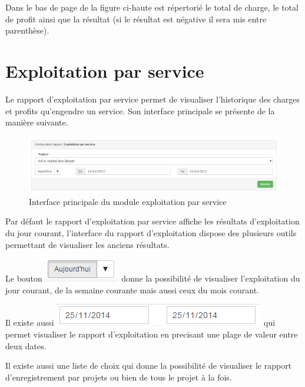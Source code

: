 \documentclass[12pt,a4paper]{report}
\begin{document}
Dans le bas de page de la figure ci-haute est répertorié le total de charge, le total de profit ainsi que la résultat (si le résultat est négative il sera mis entre parenthèse).

\newpage
\section{Exploitation par service}
Le rapport d'exploitation par service permet de visualiser l'historique des charges et profits qu'engendre un service. Son interface principale se présente de la manière suivante. 

\begin{figure}[h]
\begin{center}
\includegraphics[width=14cm]{pic/ExploService.png}
\end{center}
\caption{Interface principale du module exploitation par service}
\label{Interface principale du module exploitation par service}
\end{figure}

Par défaut le rapport d'exploitation par service affiche les résultats d'exploitation du jour courant, l'interface du rapport d'exploitation dispose des plusieurs outils permettant de visualiser les anciens résultats.

Le bouton \includegraphics[scale=0.7]{pic/Todays.png} donne la possibilité de visualiser l'exploitation du jour courant, de la semaine courante mais aussi ceux du mois courant. 

Il existe aussi  \includegraphics[scale=0.7]{pic/PlageTimes.png} qui permet visualiser le rapport d'exploitation en precisant une plage de valeur entre deux dates.

Il existe aussi une liste de choix qui donne la possibilité de visualiser le rapport d'enregistrement par projets ou bien de tous le projet à la fois.
\end{document}
